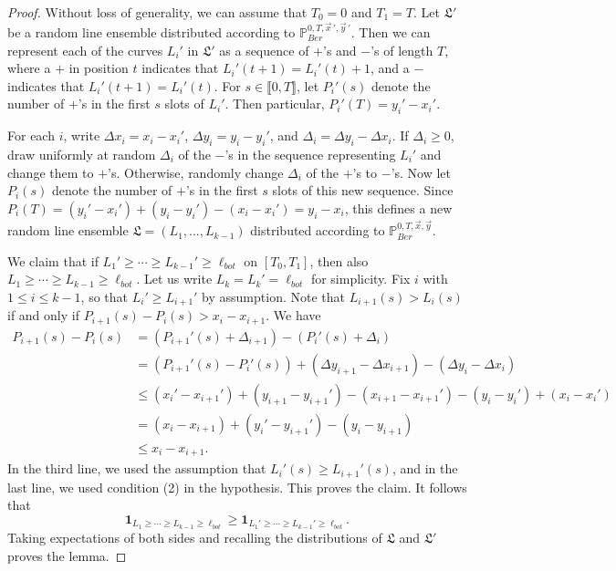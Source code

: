 	\begin{proof}
		Without loss of generality, we can assume that $T_0 = 0$ and $T_1 = T$. Let $\mathfrak{L}'$ be a random line ensemble distributed according to $\mathbb{P}^{0, T, \vec{x}\,', \vec{y}\,'}_{Ber}$. Then we can represent each of the curves $L_i'$ in $\mathfrak{L}'$ as a sequence of $+$'s and $-$'s of length $T$, where a $+$ in position $t$ indicates that $L_i'(t+1) = L_i'(t) + 1$, and a $-$ indicates that $L_i'(t+1) = L_i'(t)$. For $s\in\llbracket 0, T\rrbracket$, let $P_i'(s)$ denote the number of $+$'s in the first $s$ slots of $L_i'$. Then particular, $P_i'(T) = y_i' - x_i'$.
		
		For each $i$, write $\Delta x_i = x_i - x_i'$, $\Delta y_i = y_i - y_i'$, and $\Delta_i = \Delta y_i - \Delta x_i$. If $\Delta_i \geq 0$, draw uniformly at random $\Delta_i$ of the $-$'s in the sequence representing $L_i'$ and change them to $+$'s. Otherwise, randomly change $\Delta_i$ of the $+$'s to $-$'s. Now let $P_i(s)$ denote the number of $+$'s in the first $s$ slots of this new sequence. Since $P_i(T) = (y_i' - x_i') + (y_i - y_i') - (x_i - x_i') = y_i - x_i$, this defines a new random line ensemble $\mathfrak{L} = (L_1,\dots,L_{k-1})$ distributed according to $\mathbb{P}^{0,T,\vec{x},\vec{y}}_{Ber}$.
		
		We claim that if $L_1' \geq \cdots \geq L_{k-1}' \geq \ell_{bot}$ on $[T_0, T_1]$, then also $L_1 \geq \cdots \geq L_{k-1} \geq \ell_{bot}$. Let us write $L_k = L_k' = \ell_{bot}$ for simplicity. Fix $i$ with $1\leq i\leq k - 1$, so that $L_i' \geq L_{i+1}'$ by assumption. Note that $L_{i+1}(s) > L_i(s)$ if and only if $P_{i+1}(s) - P_i(s) > x_i - x_{i+1}$. We have
		\begin{align*}
		P_{i+1}(s) - P_i(s) &= (P_{i+1}'(s) + \Delta_{i+1}) - (P_i'(s) + \Delta_i)\\
		&= (P_{i+1}'(s) - P_i'(s)) + (\Delta y_{i+1} - \Delta x_{i+1}) - (\Delta y_i - \Delta x_i)\\
		&\leq (x_i' - x_{i+1}') + (y_{i+1} - y_{i+1}') - (x_{i+1} - x_{i+1}') - (y_i - y_i') + (x_i - x_i')\\
		&= (x_i - x_{i+1}) + (y_i' - y_{i+1}') - (y_i - y_{i+1})\\
		&\leq x_i - x_{i+1}.
		\end{align*}
		In the third line, we used the assumption that $L_i'(s) \geq L_{i+1}'(s)$, and in the last line, we used condition (2) in the hypothesis. This proves the claim. It follows that
		\[
		\mathbf{1}_{L_1 \geq \cdots \geq L_{k-1} \geq \ell_{bot}} \geq \mathbf{1}_{L_1' \geq \cdots \geq L_{k-1}' \geq \ell_{bot}}.
		\]
		Taking expectations of both sides and recalling the distributions of $\mathfrak{L}$ and $\mathfrak{L}'$ proves the lemma.
		
		\end{proof}
		
